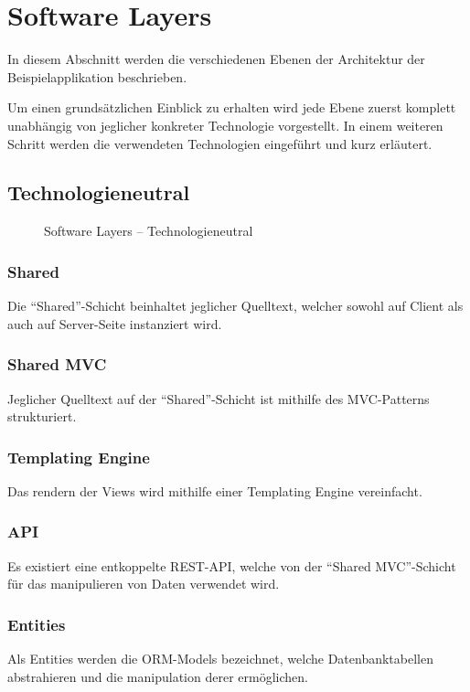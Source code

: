 \section{Software Layers}
\label{sec:sad-layers}

In diesem Abschnitt werden die verschiedenen Ebenen der Architektur der Beispielapplikation beschrieben.

Um einen grundsätzlichen Einblick zu erhalten wird jede Ebene zuerst komplett unabhängig von jeglicher konkreter Technologie vorgestellt. In einem weiteren Schritt werden die verwendeten Technologien eingeführt und kurz erläutert.


\subsection*{Technologieneutral}

\begin{figure}[H]
	\centering{
		
	}

	\caption{Software Layers -- Technologieneutral}
\end{figure}

\subsubsection*{Shared}
Die ``Shared''-Schicht beinhaltet jeglicher Quelltext, welcher sowohl auf Client als auch auf Server-Seite instanziert wird.

\subsubsection*{Shared MVC}
Jeglicher Quelltext auf der ``Shared''-Schicht ist mithilfe des MVC-Patterns strukturiert.

\subsubsection*{Templating Engine}
Das rendern der Views wird mithilfe einer Templating Engine vereinfacht.

\subsubsection*{API}
Es existiert eine entkoppelte \gls{REST}-API, welche von der ``Shared MVC''-Schicht für das manipulieren von Daten verwendet wird.

\subsubsection*{Entities}
Als Entities werden die \gls{ORM}-Models bezeichnet, welche Datenbanktabellen abstrahieren und die manipulation derer ermöglichen.

